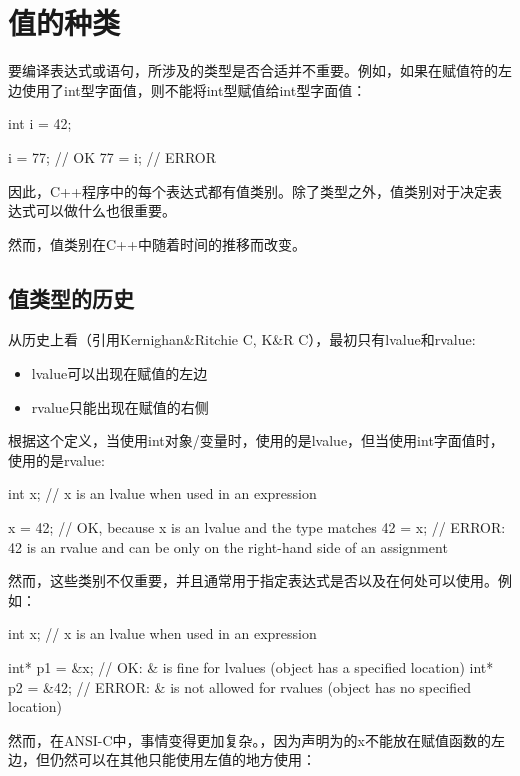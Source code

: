 \section{值的种类}
要编译表达式或语句，所涉及的类型是否合适并不重要。例如，如果在赋值符的左边使用了int型字面值，则不能将int型赋值给int型字面值：

\begin{cppcode}
int i = 42;

i = 77; // OK
77 = i; // ERROR
\end{cppcode}

因此，C++程序中的每个表达式都有值类别。除了类型之外，值类别对于决定表达式可以做什么也很重要。

然而，值类别在C++中随着时间的推移而改变。

\subsection{值类型的历史}

从历史上看（引用Kernighan\&Ritchie C, K\&R C），最初只有lvalue和rvalue:

\begin{itemize}
	\item lvalue可以出现在赋值的左边
	\item rvalue只能出现在赋值的右侧
\end{itemize}

根据这个定义，当使用int对象/变量时，使用的是lvalue，但当使用int字面值时，使用的是rvalue:

\begin{cppcode}
int x; // x is an lvalue when used in an expression

x = 42; // OK, because x is an lvalue and the type matches
42 = x; // ERROR: 42 is an rvalue and can be only on the right-hand side of an assignment
\end{cppcode}

然而，这些类别不仅重要，并且通常用于指定表达式是否以及在何处可以使用。例如：

\begin{cppcode}
int x; // x is an lvalue when used in an expression

int* p1 = &x; // OK: & is fine for lvalues (object has a specified location)
int* p2 = &42; // ERROR: & is not allowed for rvalues (object has no specified location)
\end{cppcode}

然而，在ANSI-C中，事情变得更加复杂。，因为声明为的x不能放在赋值函数的左边，但仍然可以在其他只能使用左值的地方使用：

